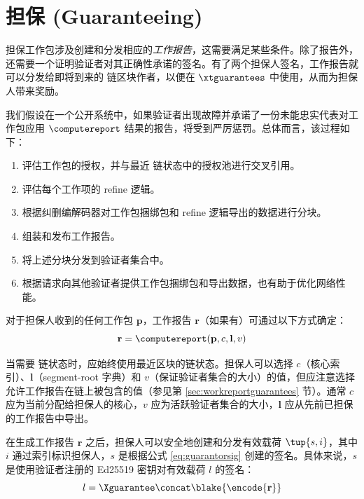 \section{担保 (Guaranteeing)}\label{sec:guaranteeing}

担保工作包涉及创建和分发相应的\emph{工作报告}，这需要满足某些条件。除了报告外，还需要一个证明验证者对其正确性承诺的签名。有了两个担保人签名，工作报告就可以分发给即将到来的 \Jam 链区块作者，以便在 $\xtguarantees$ 中使用，从而为担保人带来奖励。

我们假设在一个公开系统中，如果验证者出现故障并承诺了一份未能忠实代表对工作包应用 $\computereport$ 结果的报告，将受到严厉惩罚。总体而言，该过程如下：

\begin{enumerate}
    \item 评估工作包的授权，并与最近 \Jam 链状态中的授权池进行交叉引用。
    \item 评估每个工作项的 refine 逻辑。
    \item 根据纠删编解码器对工作包捆绑包和 refine 逻辑导出的数据进行分块。
    \item 组装和发布工作报告。
    \item 将上述分块分发到验证者集合中。
    \item 根据请求向其他验证者提供工作包捆绑包和导出数据，也有助于优化网络性能。
\end{enumerate}

对于担保人收到的任何工作包 $\mathbf{p}$，工作报告 $\mathbf{r}$（如果有）可通过以下方式确定：
\begin{equation}
  \mathbf{r} = \computereport(\mathbf{p}, c, \mathbf{l}, v)
\end{equation}

当需要 \Jam 链状态时，应始终使用最近区块的链状态。担保人可以选择 $c$（核心索引）、$\mathbf{l}$（segment-root 字典）和 $v$（保证验证者集合的大小）的值，但应注意选择允许工作报告在链上被包含的值（参见第 \ref{sec:workreportguarantees} 节）。通常 $c$ 应为当前分配给担保人的核心，$v$ 应为活跃验证者集合的大小，$\mathbf{l}$ 应从先前已担保的工作报告中导出。

在生成工作报告 $\mathbf{r}$ 之后，担保人可以安全地创建和分发有效载荷 $\tup{s, i}$，其中 $i$ 通过索引标识担保人，$s$ 是根据公式 \ref{eq:guarantorsig} 创建的签名。具体来说，$s$ 是使用验证者注册的 Ed25519 密钥对有效载荷 $l$ 的签名：
\begin{equation}
  l = \Xguarantee \concat \blake{\encode{\mathbf{r}}}
\end{equation}

